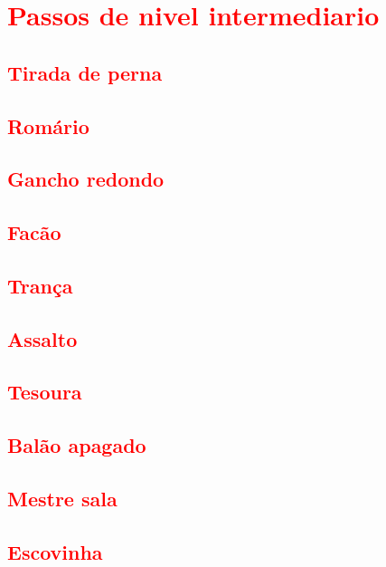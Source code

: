 

\chapter{\textcolor{red}{Passos de nivel intermediario}}

\section{\textcolor{red}{Tirada de perna}}
\section{\textcolor{red}{Romário}}
\section{\textcolor{red}{Gancho redondo}}
\section{\textcolor{red}{Facão}}
\section{\textcolor{red}{Trança}}
\section{\textcolor{red}{Assalto}}
\section{\textcolor{red}{Tesoura}}
\section{\textcolor{red}{Balão apagado}}
\section{\textcolor{red}{Mestre sala}}
\section{\textcolor{red}{Escovinha}}

